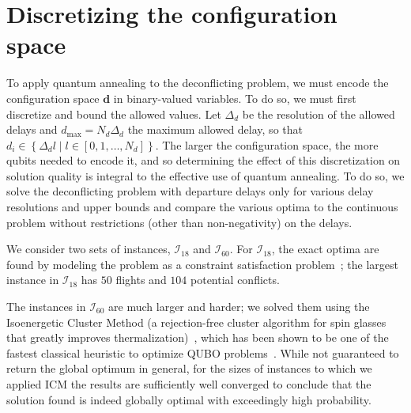 \section{Discretizing the configuration space}
To apply quantum annealing to the deconflicting problem, we must encode the configuration space $\mathbf d$ in binary-valued variables.
To do so, we must first discretize and bound the allowed values.
Let $\Delta_d$ be the resolution of the allowed delays and $d_{\max} = N_d \Delta_d$ the maximum allowed delay, so that $d_i \in \left\{\Delta_d l \middle| l \in [0, 1, \ldots, N_d]\right\}$.
The larger the configuration space, the more qubits needed to encode it, and so determining the effect of this discretization on solution quality is integral to the effective use of quantum annealing.
To do so, we solve the deconflicting problem with departure delays only for various delay resolutions and upper bounds and compare the various optima to the continuous problem without restrictions (other than non-negativity) on the delays.

We consider two sets of instances, $\mathcal I_{18}$ and $\mathcal I_{60}$.
For $\mathcal I_{18}$, the exact optima are found by modeling the problem as a constraint satisfaction problem~\cite{numberjack}; the largest instance in $\mathcal I_{18}$ has $50$ flights and $104$ potential conflicts.

The instances in $\mathcal I_{60}$ are much larger and harder; we solved them using the Isoenergetic Cluster Method (a
rejection-free cluster algorithm for spin glasses that greatly improves
thermalization)~\cite{zhu2015}, which has been shown to be one of the fastest
classical heuristic to optimize QUBO problems~\cite{mandra2016}.
While not guaranteed to return the global optimum in general, for the sizes of instances to which we applied ICM the results are sufficiently well converged to conclude that the solution found is indeed globally optimal with exceedingly high probability.


